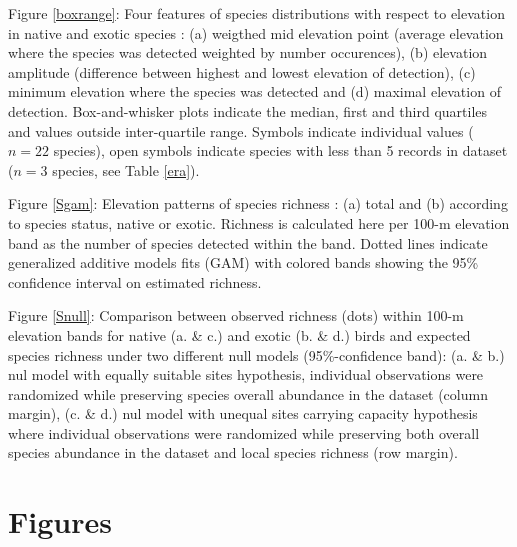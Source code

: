 \documentclass{article}
\begin{document}
Figure \ref{boxrange}: Four features of species distributions with respect to elevation in native and exotic species : (a) weigthed mid elevation point (average elevation where the species was detected weighted by number occurences), (b) elevation amplitude (difference between highest and lowest elevation of detection), (c) minimum elevation where the species was detected and (d) maximal elevation of detection. Box-and-whisker plots indicate the median, first and third quartiles and values outside inter-quartile range. Symbols indicate individual values ($n=22$ species), open symbols indicate species with less than 5 records in dataset ($n=3$ species, see Table \ref{era}).

Figure \ref{Sgam}: Elevation patterns of species richness : (a) total and (b) according to species status, native or exotic. Richness is calculated here per 100-m elevation band as the number of species detected within the band. Dotted lines indicate generalized additive models fits (GAM) with colored bands showing the 95\% confidence interval on estimated richness. 

Figure \ref{Snull}: Comparison between observed richness (dots) within 100-m elevation bands for native (a. \& c.) and exotic (b. \& d.) birds and expected species richness under two different null models (95\%-confidence band): (a. \& b.) nul model with equally suitable sites hypothesis, individual observations were randomized while preserving species overall abundance in the dataset (column margin), (c. \& d.) nul model with unequal sites carrying capacity hypothesis where individual observations were randomized while preserving both overall species abundance in the dataset and local species richness (row margin).

\section*{Figures}
\end{document}
